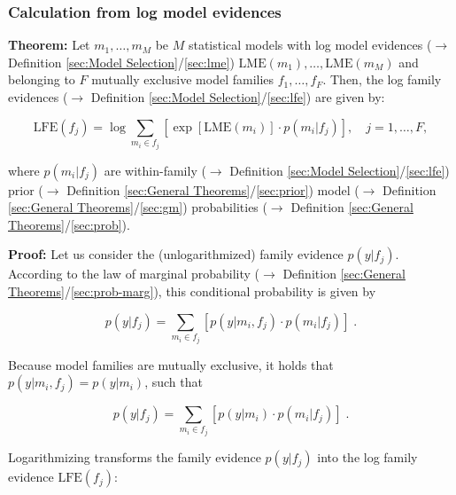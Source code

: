 \documentclass[a4paper,12pt,twoside]{book}
\begin{document}
\subsubsection[\textbf{Calculation from log model evidences}]{Calculation from log model evidences} \label{sec:lfe-lme}
\setcounter{equation}{0}

\textbf{Theorem:} Let $m_1, \ldots, m_M$ be $M$ statistical models with log model evidences ($\rightarrow$ Definition \ref{sec:Model Selection}/\ref{sec:lme}) $\mathrm{LME}(m_1), \ldots, \mathrm{LME}(m_M)$ and belonging to $F$ mutually exclusive model families $f_1, \ldots, f_F$. Then, the log family evidences ($\rightarrow$ Definition \ref{sec:Model Selection}/\ref{sec:lfe}) are given by:

\begin{equation} \label{eq:lfe-lme-LFE-LME}
\mathrm{LFE}(f_j) = \log \sum_{m_i \in f_j} \left[ \exp[\mathrm{LME}(m_i)] \cdot p(m_i|f_j) \right], \quad j = 1, \ldots, F,
\end{equation}

where $p(m_i \vert f_j)$ are within-family ($\rightarrow$ Definition \ref{sec:Model Selection}/\ref{sec:lfe}) prior ($\rightarrow$ Definition \ref{sec:General Theorems}/\ref{sec:prior}) model ($\rightarrow$ Definition \ref{sec:General Theorems}/\ref{sec:gm}) probabilities ($\rightarrow$ Definition \ref{sec:General Theorems}/\ref{sec:prob}).


\vspace{1em}
\textbf{Proof:} Let us consider the (unlogarithmized) family evidence $p(y \vert f_j)$. According to the law of marginal probability ($\rightarrow$ Definition \ref{sec:General Theorems}/\ref{sec:prob-marg}), this conditional probability is given by

\begin{equation} \label{eq:lfe-lme-FE-ME-s1}
p(y|f_j) = \sum_{m_i \in f_j} \left[ p(y|m_i,f_j) \cdot p(m_i|f_j) \right] \; .
\end{equation}

Because model families are mutually exclusive, it holds that $p(y \vert m_i,f_j) = p(y \vert m_i)$, such that

\begin{equation} \label{eq:lfe-lme-FE-ME-s2}
p(y|f_j) = \sum_{m_i \in f_j} \left[ p(y|m_i) \cdot p(m_i|f_j) \right] \; .
\end{equation}

Logarithmizing transforms the family evidence $p(y \vert f_j)$ into the log family evidence $\mathrm{LFE}(f_j)$:
\end{document}

